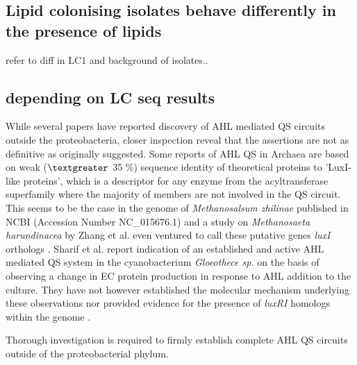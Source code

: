 \documentclass[11pt]{article}
\begin{document}
 
\subsection{Lipid colonising isolates behave differently in the presence of lipids}
refer to diff in LC1 and background of isolates.. 


\subsection{depending on LC seq results}
While several papers have reported discovery of AHL mediated QS circuits outside the proteobacteria, closer inspection reveal that the assertions are not as definitive as originally suggested. Some reports of AHL QS in Archaea are based on weak ($\textgreater$ 35 \%) sequence identity of theoretical proteins to 'LuxI-like proteins', which is a descriptor for any enzyme from the acyltransferase superfamily where the majority of members are not involved in the QS circuit. This seems to be the case in the genome of \emph{Methanosalsum zhilinae} published in NCBI (Accession Number NC\_015676.1) and a study on \emph{Methanosaeta harundinacea} by Zhang et al. even ventured to call these putative genes \emph{luxI} orthologs \cite{zhang2012}. Sharif et al. report indication of an established and active AHL mediated QS system in the cyanobacterium \emph{Gloeothece sp.} on the basis of observing a change in EC protein production in response to AHL addition to the culture. They have not however established the molecular mechanism underlying these observations nor provided evidence for the presence of \emph{luxRI} homologs within the genome \cite{sharif2008}. 


Thorough investigation is required to firmly establish complete AHL QS circuits outside of the proteobacterial phylum. 
\end{document}
